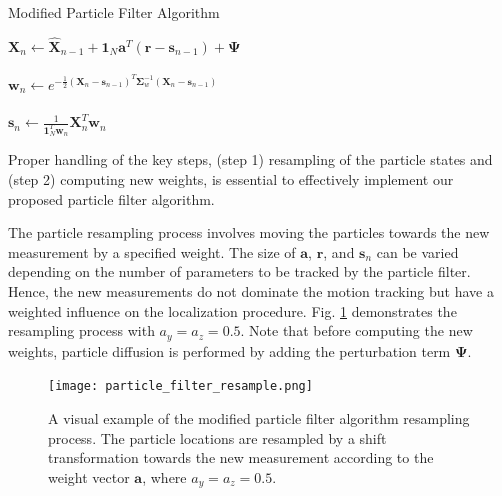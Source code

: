 \documentclass[10pt,journal,final]{IEEEtran}
\begin{document}
\begin{algorithm}[h] 
\renewcommand{\thealgocf}{}
	\label{algo:particle_filter}
	\caption{Modified Particle Filter Algorithm}
	\SetAlgoLined
	
	
	
	$\mathbf{X}_n \xleftarrow[]{} \mathbf{\hat{X}}_{n-1} + \mathbf{1}_N \mathbf{a}^T (\mathbf{r} - \mathbf{s}_{n-1}) + \mathbf{\Psi}$ %
	
	$\mathbf{w}_n \xleftarrow[]{} e^{-\frac{1}{2}(\mathbf{X}_n-\mathbf{s}_{n-1})^T\mathbf{\Sigma}_w^{-1}(\mathbf{X}_n-\mathbf{s}_{n-1})}$ %
	
	$\mathbf{s}_n \xleftarrow[]{} \frac{1}{\mathbf{1}_N^T \mathbf{w}_n} \mathbf{X}_n^T \mathbf{w}_n$ %
\end{algorithm}

Proper handling of the key steps, (step 1) resampling of the particle states and (step 2) computing new weights, is essential to effectively implement our proposed particle filter algorithm. 

The particle resampling process involves moving the particles towards the new measurement by a specified weight.
The size of $\mathbf{a}$, $\mathbf{r}$, and $\mathbf{s}_n$ can be varied depending on the number of parameters to be tracked by the particle filter.
Hence, the new measurements do not dominate the motion tracking but have a weighted influence on the localization procedure. 
Fig. \ref{fig:particle_filter} demonstrates the resampling process with $a_y = a_z = 0.5$.
Note that before computing the new weights, particle diffusion is performed by adding the perturbation term $\mathbf{\Psi}$.

\begin{figure}[h]
	\centering
	\texttt{[image: particle\_filter\_resample.png]}
	\caption{A visual example of the modified particle filter algorithm resampling process. The particle locations are resampled by a shift transformation towards the new measurement according to the weight vector $\mathbf{a}$, where $a_y = a_z = 0.5$.}
	\label{fig:particle_filter}
\end{figure}
\end{document}
